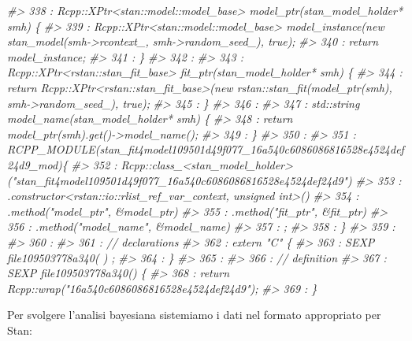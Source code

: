\documentclass[
  10pt,
  italian,
  a4paper,
  extrafontsizes,onecolumn,openright
  ]{memoir}
\newenvironment{Shaded}{\begin{snugshade}}{\end{snugshade}}
\newcommand{\CommentTok}[1]{\textcolor[rgb]{0.56,0.35,0.01}{\textit{#1}}}
\begin{document}
\begin{Shaded}
\begin{Highlighting}[]
\CommentTok{\#\textgreater{}  338 : Rcpp::XPtr\textless{}stan::model::model\_base\textgreater{} model\_ptr(stan\_model\_holder* smh) \{}
\CommentTok{\#\textgreater{}  339 :   Rcpp::XPtr\textless{}stan::model::model\_base\textgreater{} model\_instance(new stan\_model(smh{-}\textgreater{}rcontext\_, smh{-}\textgreater{}random\_seed\_), true);}
\CommentTok{\#\textgreater{}  340 :   return model\_instance;}
\CommentTok{\#\textgreater{}  341 : \}}
\CommentTok{\#\textgreater{}  342 : }
\CommentTok{\#\textgreater{}  343 : Rcpp::XPtr\textless{}rstan::stan\_fit\_base\textgreater{} fit\_ptr(stan\_model\_holder* smh) \{}
\CommentTok{\#\textgreater{}  344 :   return Rcpp::XPtr\textless{}rstan::stan\_fit\_base\textgreater{}(new rstan::stan\_fit(model\_ptr(smh), smh{-}\textgreater{}random\_seed\_), true);}
\CommentTok{\#\textgreater{}  345 : \}}
\CommentTok{\#\textgreater{}  346 : }
\CommentTok{\#\textgreater{}  347 : std::string model\_name(stan\_model\_holder* smh) \{}
\CommentTok{\#\textgreater{}  348 :   return model\_ptr(smh).get(){-}\textgreater{}model\_name();}
\CommentTok{\#\textgreater{}  349 : \}}
\CommentTok{\#\textgreater{}  350 : }
\CommentTok{\#\textgreater{}  351 : RCPP\_MODULE(stan\_fit4model109501d49f077\_16a540c6086086816528e4524def24d9\_mod)\{}
\CommentTok{\#\textgreater{}  352 :   Rcpp::class\_\textless{}stan\_model\_holder\textgreater{}("stan\_fit4model109501d49f077\_16a540c6086086816528e4524def24d9")}
\CommentTok{\#\textgreater{}  353 :   .constructor\textless{}rstan::io::rlist\_ref\_var\_context, unsigned int\textgreater{}()}
\CommentTok{\#\textgreater{}  354 :   .method("model\_ptr", \&model\_ptr)}
\CommentTok{\#\textgreater{}  355 :   .method("fit\_ptr", \&fit\_ptr)}
\CommentTok{\#\textgreater{}  356 :   .method("model\_name", \&model\_name)}
\CommentTok{\#\textgreater{}  357 :   ;}
\CommentTok{\#\textgreater{}  358 : \}}
\CommentTok{\#\textgreater{}  359 : }
\CommentTok{\#\textgreater{}  360 : }
\CommentTok{\#\textgreater{}  361 : // declarations}
\CommentTok{\#\textgreater{}  362 : extern "C" \{}
\CommentTok{\#\textgreater{}  363 : SEXP file109503778a340( ) ;}
\CommentTok{\#\textgreater{}  364 : \}}
\CommentTok{\#\textgreater{}  365 : }
\CommentTok{\#\textgreater{}  366 : // definition}
\CommentTok{\#\textgreater{}  367 : SEXP file109503778a340() \{}
\CommentTok{\#\textgreater{}  368 :  return Rcpp::wrap("16a540c6086086816528e4524def24d9");}
\CommentTok{\#\textgreater{}  369 : \}}
\end{Highlighting}
\end{Shaded}

Per svolgere l'analisi bayesiana sistemiamo i dati nel formato appropriato per Stan:
\end{document}
